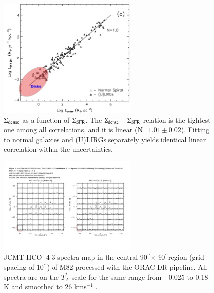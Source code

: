 \documentclass[legal,11pt]{article}
\def\arcsec {\hbox{$^{\prime\prime}$}}
\def\,{\thinspace}
\def\HCOP       {HCO$^{+}$}
\begin{document}
\begin{figure}
\centering
\includegraphics[width=0.6\textwidth]{HCN_IR.png}
\caption{
${\rm \Sigma_{dense}}$ as a function of $\Sigma_{\rm SFR}$. The ${\rm \Sigma_{dense}}$ 
        - $\Sigma_{\rm SFR}$ relation is the tightest one among all correlations, 
        and it is linear (N=$1.01 \pm 0.02$). Fitting to normal galaxies and (U)LIRGs separately 
yields identical linear correlation within the uncertainties.} 
\label{fig:hcn-ir}
\end{figure}






\begin{figure}
\centering

\includegraphics[width=0.6\textwidth]{Tan_M82.pdf}
\caption{
JCMT \HCOP 4-3 spectra map in the central 90\arcsec $\times$ 90\arcsec region (grid spacing of 10\arcsec) of M82 processed with the ORAC-DR pipeline. All spectra are on the $T_A^*$ scale for the same range from −0.025 to 0.18 K and smoothed to 26 km\,s$^{−1}$ \citep{Tan:2018}.
}
\label{fig:maffei2}
\end{figure}
\end{document}
